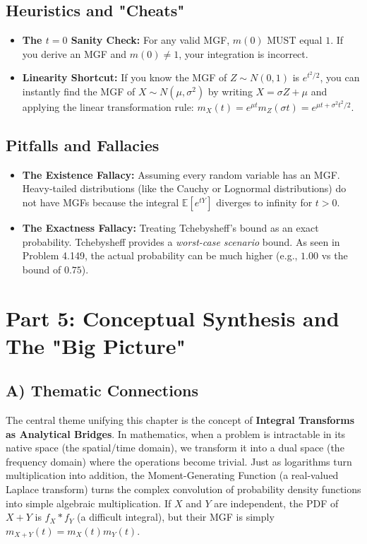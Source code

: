 \documentclass[11pt, a4paper]{article}
\theoremstyle{definition}
\theoremstyle{remark}
\newcommand{\E}{\mathbb{E}}
\begin{document}
\subsection{Heuristics and "Cheats"}
\begin{itemize}
    \item \textbf{The $t=0$ Sanity Check:} For any valid MGF, $m(0)$ MUST equal $1$. If you derive an MGF and $m(0) \neq 1$, your integration is incorrect.
    \item \textbf{Linearity Shortcut:} If you know the MGF of $Z \sim N(0,1)$ is $e^{t^2/2}$, you can instantly find the MGF of $X \sim N(\mu, \sigma^2)$ by writing $X = \sigma Z + \mu$ and applying the linear transformation rule: $m_X(t) = e^{\mu t} m_Z(\sigma t) = e^{\mu t + \sigma^2 t^2 / 2}$.
\end{itemize}

\subsection{Pitfalls and Fallacies}
\begin{itemize}
    \item \textbf{The Existence Fallacy:} Assuming every random variable has an MGF. Heavy-tailed distributions (like the Cauchy or Lognormal distributions) do not have MGFs because the integral $\E[e^{tY}]$ diverges to infinity for $t > 0$.
    \item \textbf{The Exactness Fallacy:} Treating Tchebysheff's bound as an exact probability. Tchebysheff provides a \textit{worst-case scenario} bound. As seen in Problem 4.149, the actual probability can be much higher (e.g., $1.00$ vs the bound of $0.75$).
\end{itemize}

\newpage

\section{Part 5: Conceptual Synthesis and The "Big Picture"}

\subsection{A) Thematic Connections}
The central theme unifying this chapter is the concept of \textbf{Integral Transforms as Analytical Bridges}. In mathematics, when a problem is intractable in its native space (the spatial/time domain), we transform it into a dual space (the frequency domain) where the operations become trivial. 
Just as logarithms turn multiplication into addition, the Moment-Generating Function (a real-valued Laplace transform) turns the complex convolution of probability density functions into simple algebraic multiplication. If $X$ and $Y$ are independent, the PDF of $X+Y$ is $f_X * f_Y$ (a difficult integral), but their MGF is simply $m_{X+Y}(t) = m_X(t)m_Y(t)$.
\end{document}
